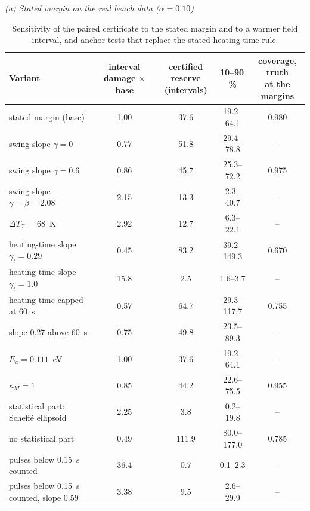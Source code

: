 \begin{table}[htbp]
\centering
\caption{Sensitivity of the paired certificate to the stated margin and to a warmer field interval, and anchor tests that
replace the stated heating-time rule.}
\label{tab:S4}
\footnotesize
\textit{(a) Stated margin on the real bench data ($\alpha=0.10$)}\\[2pt]
\begin{tabular*}{\textwidth}{@{\extracolsep{\fill}}lcccc@{}}
\toprule
Variant & \makecell{interval damage\\$\times$ base} & \makecell{certified reserve\\(intervals)} & 10--90\,\% &
\makecell{coverage, truth\\at the margins} \\
\midrule
stated margin (base) & 1.00 & 37.6 & 19.2--64.1 & 0.980 \\
swing slope $\gamma=0$ & 0.77 & 51.8 & 29.4--78.8 & -- \\
swing slope $\gamma=0.6$ & 0.86 & 45.7 & 25.3--72.2 & 0.975 \\
swing slope $\gamma=\beta=2.08$ & 2.15 & 13.3 & 2.3--40.7 & -- \\
$\Delta T_{\mathcal T}=68$~K & 2.92 & 12.7 & 6.3--22.1 & -- \\
heating-time slope $\gamma_t=0.29$ & 0.45 & 83.2 & 39.2--149.3 & 0.670 \\
heating-time slope $\gamma_t=1.0$ & 15.8 & 2.5 & 1.6--3.7 & -- \\
heating time capped at 60~s & 0.57 & 64.7 & 29.3--117.7 & 0.755 \\
slope 0.27 above 60~s & 0.75 & 49.8 & 23.5--89.3 & -- \\
$E_a=0.111$~eV & 1.00 & 37.6 & 19.2--64.1 & -- \\
$\kappa_M=1$ & 0.85 & 44.2 & 22.6--75.5 & 0.955 \\
statistical part: Scheff\'e ellipsoid & 2.25 & 3.8 & 0.2--19.8 & -- \\
no statistical part & 0.49 & 111.9 & 80.0--177.0 & 0.785 \\
pulses below 0.15~s counted & 36.4 & 0.7 & 0.1--2.3 & -- \\
pulses below 0.15~s counted, slope 0.59 & 3.38 & 9.5 & 2.6--29.9 & -- \\
\bottomrule
\end{tabular*}


\end{table}
